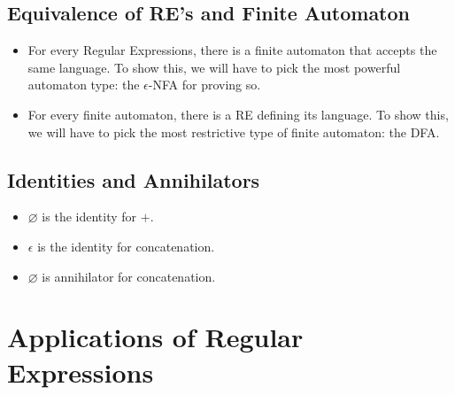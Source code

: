 \documentclass{report}
\begin{document}
\subsection{Equivalence of RE’s and Finite Automaton}
    \begin{itemize}
        \item For every Regular Expressions, there is a finite automaton that accepts the same language. To show this, we will have to pick the most powerful automaton type: the $\epsilon$-NFA for proving so.
        \item For every finite automaton, there is a RE defining its language. To show this, we will have to pick the most restrictive type of finite automaton: the DFA.
    \end{itemize}
\begin{center}
\end{center}

\subsection{Identities and Annihilators}
\begin{itemize}
    \item $\varnothing$ is the identity for $+$.
    \item $\epsilon$ is the identity for concatenation.
    \item $\varnothing$ is annihilator for concatenation.
\end{itemize}

\section{Applications of Regular Expressions}
\end{document}
